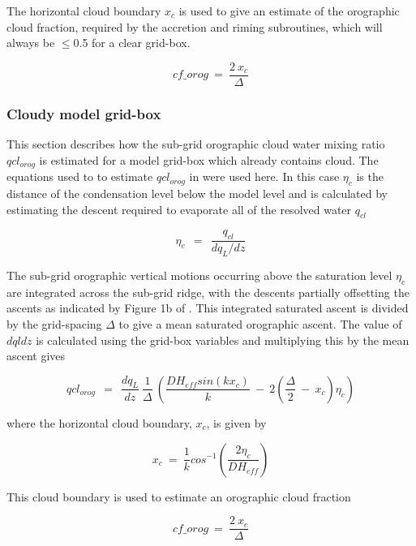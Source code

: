 \documentclass{UMDP_article}
\begin{document}
The horizontal cloud boundary $x_c$ is used to give an estimate of the orographic cloud fraction, required by the accretion and riming subroutines, which will always be $\le$0.5 for a clear grid-box.

\begin{equation}
cf\_orog ~=~ \frac{2 ~ x_c}{\Delta}
\end{equation}


\subsubsection{Cloudy model grid-box}

This section describes how the sub-grid orographic cloud water mixing ratio $qcl_{orog}$ is estimated for a model grid-box which already contains cloud.  The equations used to to estimate $qcl_{orog}$ in \cite{Smith:etal:2016} were used here.  In this case $\eta_c$ is the distance of the condensation level below the model level and is calculated by estimating the descent required to evaporate all of the resolved water $q_{cl}$  

\begin{equation} 
\eta_c  ~~=~~  \frac{q_{cl}}{ dq_{L}/dz }
\end{equation}

The sub-grid orographic vertical motions occurring above the saturation level $\eta_c$ are integrated across the sub-grid ridge, with the descents partially offsetting the ascents as indicated by Figure 1b of \cite{Smith:etal:2016}.  This integrated saturated ascent is divided by the grid-spacing $\Delta$ to give a mean saturated orographic ascent.  The value of $dqldz$ is calculated using the grid-box variables and multiplying this by the mean ascent gives 

\begin{equation} 
qcl_{orog} ~~=~~   \frac{dq_{L}}{dz}~ \frac{1}{\Delta}~  \left (  
  \frac{ D H_{eff} sin(k x_c) }{k}  ~-~ 2 (\frac{\Delta}{2} ~-~ x_c ) \eta_c
 \right ) 
\end{equation}

where the horizontal cloud boundary, $x_c$, is given by 

\begin{equation}
x_c ~=~ \frac{1}{k} cos^{-1} \left ( \frac{2 \eta_c}{ D H_{eff} } \right ) 
\end{equation}

This cloud boundary is used to estimate an orographic cloud fraction 

\begin{equation}
cf\_orog ~=~ \frac{2 ~ x_c}{\Delta}
\end{equation}
\end{document}

